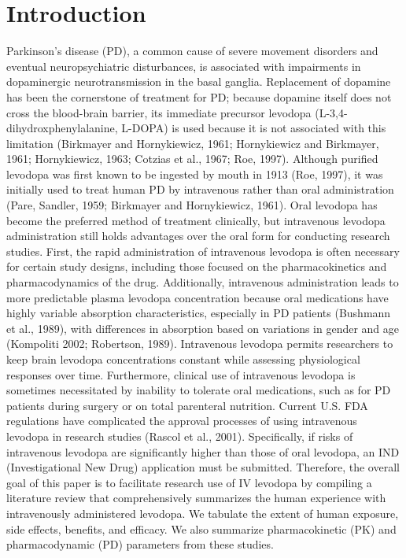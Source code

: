 \section{Introduction}
	Parkinson’s disease (PD), a common cause of severe movement disorders and eventual neuropsychiatric disturbances, is associated with impairments in dopaminergic neurotransmission in the basal ganglia. Replacement of dopamine has been the cornerstone of treatment for PD; because dopamine itself does not cross the blood-brain barrier, its immediate precursor levodopa (L-3,4-dihydroxphenylalanine, L-DOPA) is used because it is not associated with this limitation (Birkmayer and Hornykiewicz, 1961; Hornykiewicz and Birkmayer, 1961; Hornykiewicz, 1963; Cotzias et al., 1967; Roe, 1997). Although purified levodopa was first known to be ingested by mouth in 1913 (Roe, 1997), it was initially used to treat human PD by intravenous rather than oral administration (Pare, Sandler, 1959; Birkmayer and Hornykiewicz, 1961).	 
Oral levodopa has become the preferred method of treatment clinically, but intravenous levodopa administration still holds advantages over the oral form for conducting research studies.  First, the rapid administration of intravenous levodopa is often necessary for certain study designs, including those focused on the pharmacokinetics and pharmacodynamics of the drug.  Additionally, intravenous administration leads to more predictable plasma levodopa concentration because oral medications have highly variable absorption characteristics, especially in PD patients (Bushmann et al., 1989), with differences in absorption based on variations in gender and age (Kompoliti 2002; Robertson, 1989).  Intravenous levodopa permits researchers to keep brain levodopa concentrations constant while assessing physiological responses over time.  Furthermore, clinical use of intravenous levodopa is sometimes necessitated by inability to tolerate oral medications, such as for PD patients during surgery or on total parenteral nutrition.  
Current U.S. FDA regulations have complicated the approval processes of using intravenous levodopa in research studies (Rascol et al., 2001).  Specifically, if risks of intravenous levodopa are significantly higher than those of oral levodopa, an IND (Investigational New Drug) application must be submitted.  Therefore, the overall goal of this paper is to facilitate research use of IV levodopa by compiling a literature review that comprehensively summarizes the human experience with intravenously administered levodopa.  We tabulate the extent of human exposure, side effects, benefits, and efficacy.  We also summarize pharmacokinetic (PK) and pharmacodynamic (PD) parameters from these studies. 
